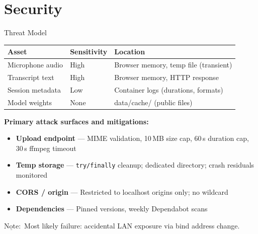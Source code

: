 \documentclass{beamer}
\newcommand{\nt}{$\underline{\text{Note}}:$ }
\begin{document}
\section{Security}

\begin{frame}{Threat Model}
    \small
    \begin{table}
    \centering
    \scriptsize
    \begin{tabular}{lll}
        \toprule
        \textbf{Asset} & \textbf{Sensitivity} & \textbf{Location} \\
        \midrule
        Microphone audio  & High  & Browser memory, temp file (transient) \\
        Transcript text   & High  & Browser memory, HTTP response \\
        Session metadata  & Low   & Container logs (durations, formats) \\
        Model weights     & None  & data/cache/ (public files) \\
        \bottomrule
    \end{tabular}
    \end{table}

    \vspace{0.2em}
    \textbf{Primary attack surfaces and mitigations:}
    \begin{itemize}\setlength{\itemsep}{1pt}
        \item \textbf{Upload endpoint} --- MIME validation, 10\,MB size cap,
              60\,s duration cap, 30\,s ffmpeg timeout
        \item \textbf{Temp storage} --- \texttt{try/finally} cleanup;
              dedicated directory; crash residuals monitored
        \item \textbf{CORS / origin} --- Restricted to localhost origins only;
              no wildcard
        \item \textbf{Dependencies} --- Pinned versions, weekly Dependabot scans
    \end{itemize}

    \vspace{0.2em}
    \nt Most likely failure: accidental LAN exposure via bind address change.
\end{frame}
\end{document}
